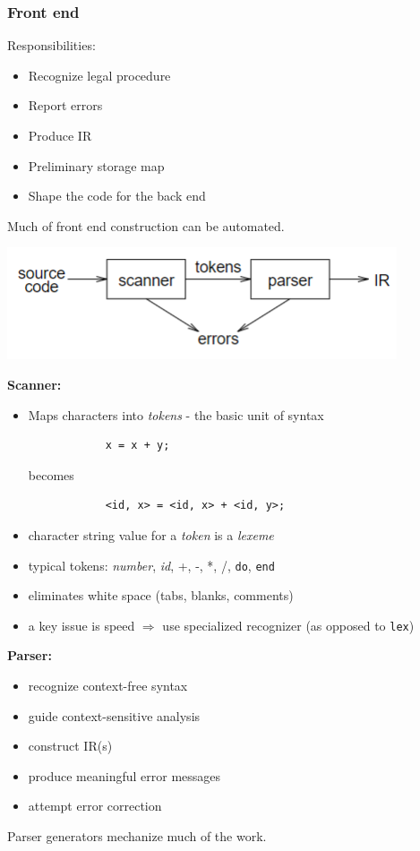 \documentclass[10pt]{article}
\begin{document}
\subsubsection*{Front end}
Responsibilities:
\begin{itemize}
    \item Recognize legal procedure
    \item Report errors
    \item Produce IR
    \item Preliminary storage map
    \item Shape the code for the back end
\end{itemize}
Much of front end construction can be automated.
\begin{center}
    \includegraphics*[scale=1]{W1_3.png}
\end{center}
\textbf{Scanner:}
\begin{itemize}
    \item Maps characters into \textit{tokens} - the basic unit of syntax
        \begin{verbatim} 
            x = x + y; 
        \end{verbatim} 
        becomes 
        \begin{verbatim}
            <id, x> = <id, x> + <id, y>;
        \end{verbatim}
    \item character string value for a \textit{token} is a \textit{lexeme}
    \item typical tokens: \textit{number}, \textit{id}, +, -, *, /, \texttt{do}, \texttt{end}
    \item eliminates white space (tabs, blanks, comments)
    \item a key issue is speed $\Rightarrow$ use specialized recognizer (as opposed to \texttt{lex})
\end{itemize}
\textbf{Parser:}
\begin{itemize}
    \item recognize context-free syntax
    \item guide context-sensitive analysis
    \item construct IR(s)
    \item produce meaningful error messages
    \item attempt error correction
\end{itemize}
Parser generators mechanize much of the work.
\end{document}
